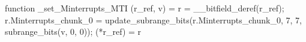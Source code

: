 function _set_Minterrupts_MTI (r_ref, v) = {
    r = __bitfield_deref(r_ref);
    r.Minterrupts_chunk_0 = update_subrange_bits(r.Minterrupts_chunk_0, 7, 7, subrange_bits(v, 0, 0));
    (*r_ref) = r
}
